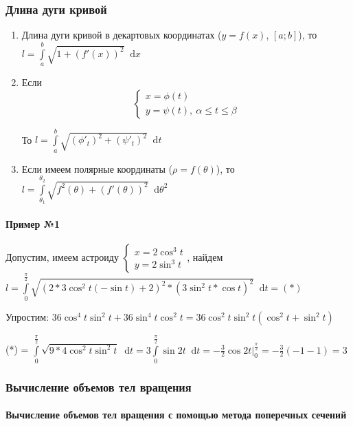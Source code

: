 \documentclass{article}
\newcommand*\diff{\mathop{}\!\mathrm{d}}
\begin{document}
\subsubsection{Длина дуги кривой}

\begin{enumerate}
    \item Длина дуги кривой в декартовых координатах ($y = f(x)$, $[a; b]$), то $l = \int\limits_{a}^{b} \sqrt{1 + (f'(x))^2} \diff x$
    \item Если $$\begin{cases}
        x = \phi(t) \\
        y = \psi(t), \ \alpha \le t \le \beta
    \end{cases}$$

    То $l = \int\limits_{a}^{b} \sqrt{(\phi'_t)^2 + (\psi'_t)^2} \diff t$
    \item Если имеем полярные координаты ($\rho = f(\theta)$), то $l = \int\limits_{\theta_1}^{\theta_2} \sqrt{f^2(\theta) + (f'(\theta))^2} \diff \theta^2$
\end{enumerate}

\paragraph{Пример №1} Допустим, имеем астроиду $
\begin{cases}
    x = 2 \cos^3 t \\
    y = 2 \sin^3 t
\end{cases}$, найдем $l = \int\limits_{0}^{\frac{\pi}{2}} \sqrt{(2 * 3 \cos^2 t (-\sin t) + 2)^2 * (3 \sin^2 t * \cos t)^2} \diff t = (*)$

Упростим: $36 \cos^4 t \sin^2 t + 36 \sin^4 t \cos^2 t = 36 \cos^2 t \sin^2 t (\cos^2 t + \sin^2 t)$

(*) = $\int\limits_{0}^{\frac{\pi}{2}} \sqrt{9 * 4 \cos^2 t \sin^2 t} \diff t = 3 \int\limits_{0}^{\frac{\pi}{2}} \sin 2t \diff t = -\frac{3}{2} \cos 2 t \bigg|_{0}^{\frac{\pi}{2}} = -\frac{3}{2} (-1 - 1) = 3$

\subsubsection{Вычисление объемов тел вращения}

\paragraph{Вычисление объемов тел вращения с помощью метода поперечных сечений}
\end{document}
